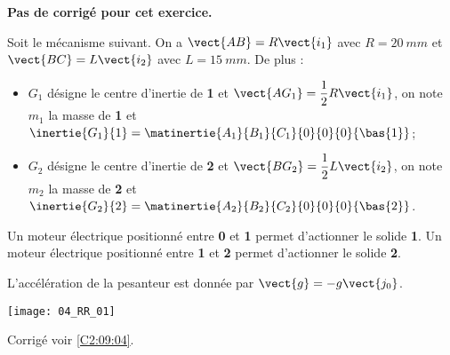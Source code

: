 \normaltrue
\correctionfalse


\setcounter{question}{0}
\ifcorrection
\else
\textbf{Pas de corrigé pour cet exercice.}
\fi

\ifprof
\else
Soit le mécanisme suivant. On a $\vect{AB}=R\vect{i_1}$ avec $R=\SI{20}{mm}$ et  
$\vect{BC}=L\vect{i_2}$ avec $L=\SI{15}{mm}$. De plus :
\begin{itemize}
\item $G_1$ désigne le centre d'inertie de \textbf{1} et $\vect{AG_1}=\dfrac{1}{2}R\vect{i_1}$, on note $m_1$ la masse de \textbf{1} et $\inertie{G_1}{1}=\matinertie{A_1}{B_1}{C_1}{0}{0}{0}{\bas{1}}$; 
\item $G_2$ désigne le centre d'inertie de \textbf{2} et $\vect{BG_2}=\dfrac{1}{2}L\vect{i_2}$, on note $m_2$ la masse de \textbf{2} et $\inertie{G_2}{2}=\matinertie{A_2}{B_2}{C_2}{0}{0}{0}{\bas{2}}$.
\end{itemize}

Un moteur électrique positionné entre \textbf{0} et \textbf{1} permet d'actionner le solide \textbf{1}.
Un moteur électrique positionné entre \textbf{1} et \textbf{2} permet d'actionner le solide \textbf{2}.

L'accélération de la pesanteur est donnée par $\vect{g}=-g\vect{j_0}$.

\begin{center}
\texttt{[image: 04\_RR\_01]}
\end{center}
\fi




\ifprof
\else
\fi


\ifprof
\else
\begin{flushright}
\footnotesize{Corrigé  voir \ref{C2:09:04}.}
\end{flushright}%
\fi